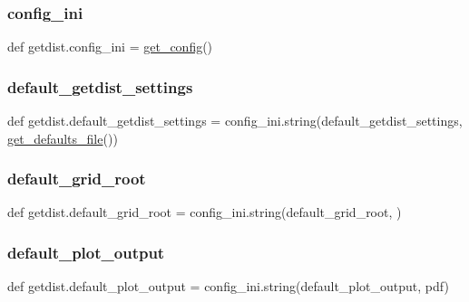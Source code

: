 \subsubsection{\texorpdfstring{config\+\_\+ini}{config\_ini}}
{\footnotesize\ttfamily def getdist.\+config\+\_\+ini = \mbox{\hyperlink{namespacegetdist_ae1cef30c152a1bd4e44ee539fd21c3db}{get\+\_\+config}}()}

\mbox{\label{namespacegetdist_a4940be008227154f9cd2c59d05256103}} 
\subsubsection{\texorpdfstring{default\+\_\+getdist\+\_\+settings}{default\_getdist\_settings}}
{\footnotesize\ttfamily def getdist.\+default\+\_\+getdist\+\_\+settings = config\+\_\+ini.\+string(\textquotesingle{}default\+\_\+getdist\+\_\+settings\textquotesingle{}, \mbox{\hyperlink{namespacegetdist_af1887c8e2da86996dd314d3cecb257dc}{get\+\_\+defaults\+\_\+file}}())}

\mbox{\label{namespacegetdist_a2ed5e7cfdf637a19ad09e719c419963a}} 
\subsubsection{\texorpdfstring{default\+\_\+grid\+\_\+root}{default\_grid\_root}}
{\footnotesize\ttfamily def getdist.\+default\+\_\+grid\+\_\+root = config\+\_\+ini.\+string(\textquotesingle{}default\+\_\+grid\+\_\+root\textquotesingle{}, \textquotesingle{}\textquotesingle{})}

\mbox{\label{namespacegetdist_a41e32cd823783b6abcda710f3eeeb0d0}} 
\subsubsection{\texorpdfstring{default\+\_\+plot\+\_\+output}{default\_plot\_output}}
{\footnotesize\ttfamily def getdist.\+default\+\_\+plot\+\_\+output = config\+\_\+ini.\+string(\textquotesingle{}default\+\_\+plot\+\_\+output\textquotesingle{}, \textquotesingle{}pdf\textquotesingle{})}

